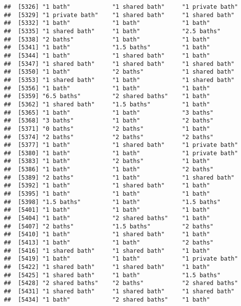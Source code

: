 \documentclass[
]{article}
\begin{document}
\begin{verbatim}
##  [5326] "1 bath"            "1 shared bath"     "1 private bath"   
##  [5329] "1 private bath"    "1 shared bath"     "1 shared bath"    
##  [5332] "1 bath"            "1 bath"            "1 bath"           
##  [5335] "1 shared bath"     "1 bath"            "2.5 baths"        
##  [5338] "2 baths"           "1 bath"            "1 bath"           
##  [5341] "1 bath"            "1.5 baths"         "1 bath"           
##  [5344] "1 bath"            "1 shared bath"     "1 bath"           
##  [5347] "1 shared bath"     "1 shared bath"     "1 shared bath"    
##  [5350] "1 bath"            "2 baths"           "1 shared bath"    
##  [5353] "1 shared bath"     "1 bath"            "1 shared bath"    
##  [5356] "1 bath"            "1 bath"            "1 bath"           
##  [5359] "6.5 baths"         "2 shared baths"    "1 bath"           
##  [5362] "1 shared bath"     "1.5 baths"         "1 bath"           
##  [5365] "1 bath"            "1 bath"            "3 baths"          
##  [5368] "3 baths"           "1 bath"            "2 baths"          
##  [5371] "0 baths"           "2 baths"           "1 bath"           
##  [5374] "2 baths"           "2 baths"           "2 baths"          
##  [5377] "1 bath"            "1 shared bath"     "1 private bath"   
##  [5380] "1 bath"            "1 bath"            "1 private bath"   
##  [5383] "1 bath"            "2 baths"           "1 bath"           
##  [5386] "1 bath"            "1 bath"            "2 baths"          
##  [5389] "2 baths"           "1 bath"            "1 shared bath"    
##  [5392] "1 bath"            "1 shared bath"     "1 bath"           
##  [5395] "1 bath"            "1 bath"            "1 bath"           
##  [5398] "1.5 baths"         "1 bath"            "1.5 baths"        
##  [5401] "1 bath"            "1 bath"            "1 bath"           
##  [5404] "1 bath"            "2 shared baths"    "1 bath"           
##  [5407] "2 baths"           "1.5 baths"         "2 baths"          
##  [5410] "1 bath"            "1 shared bath"     "1 bath"           
##  [5413] "1 bath"            "1 bath"            "2 baths"          
##  [5416] "1 shared bath"     "1 shared bath"     "1 bath"           
##  [5419] "1 bath"            "1 bath"            "1 private bath"   
##  [5422] "1 shared bath"     "1 shared bath"     "1 bath"           
##  [5425] "1 shared bath"     "1 bath"            "1.5 baths"        
##  [5428] "2 shared baths"    "2 baths"           "2 shared baths"   
##  [5431] "1 shared bath"     "1 shared bath"     "1 shared bath"    
##  [5434] "1 bath"            "2 shared baths"    "1 bath"           

\end{verbatim}
\end{document}
